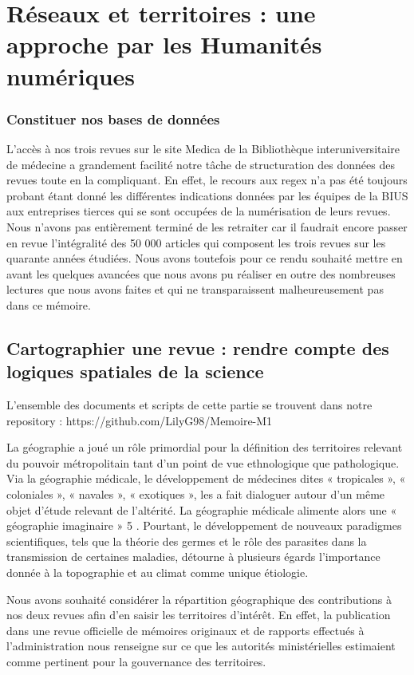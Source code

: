 \chapter{Réseaux et territoires : une approche par les Humanités numériques}

\subsection{Constituer nos bases de données }

L'accès à nos trois revues sur le site Medica de la Bibliothèque interuniversitaire de médecine a grandement facilité notre tâche de structuration des données des revues toute en la compliquant. En effet, le recours aux regex n'a pas été toujours probant étant donné les différentes indications données par les équipes de la BIUS aux entreprises tierces qui se sont occupées de la numérisation de leurs revues. Nous n'avons pas entièrement terminé de les retraiter car il faudrait encore passer en revue l'intégralité des 50 000 articles qui composent les trois revues sur les quarante années étudiées. Nous avons toutefois pour ce rendu souhaité mettre en avant les quelques avancées que nous avons pu réaliser en outre des nombreuses lectures que nous avons faites et qui ne transparaissent malheureusement pas dans ce mémoire.


\section{Cartographier une revue : rendre compte des logiques spatiales de la science}

L'ensemble des documents et scripts de cette partie se trouvent dans notre repository : https://github.com/LilyG98/Memoire-M1 


La géographie a joué un rôle primordial pour la définition des territoires relevant du pouvoir métropolitain tant d’un point de vue ethnologique que pathologique. Via la géographie médicale, le développement de médecines dites « tropicales », « coloniales », « navales », « exotiques », les a fait dialoguer autour d’un même objet d’étude relevant de l’altérité. La géographie médicale alimente alors une « géographie imaginaire » 5 . Pourtant, le développement de nouveaux paradigmes scientifiques, tels que la théorie des germes et le rôle des parasites dans la transmission de certaines maladies, détourne à plusieurs égards l’importance donnée à la topographie et au climat comme unique étiologie.

Nous avons souhaité considérer la répartition géographique des contributions à nos deux revues afin d’en saisir les territoires d’intérêt. En effet, la publication dans une revue officielle de mémoires originaux et de rapports effectués à l’administration nous renseigne sur ce que les autorités ministérielles estimaient comme pertinent pour la gouvernance des territoires.

